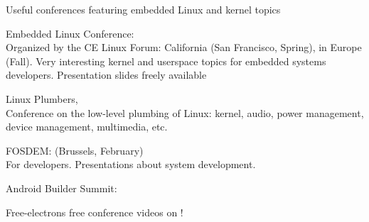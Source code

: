   Useful conferences featuring embedded Linux and kernel topics
  \startitemize
  \item Embedded Linux Conference: \\
    Organized by the CE Linux Forum: California (San Francisco,
    Spring), in Europe (Fall).  Very interesting kernel and userspace
    topics for embedded systems developers.  Presentation slides
    freely available
  \item Linux Plumbers, \\
    Conference on the low-level plumbing of Linux: kernel, audio,
    power management, device management, multimedia, etc.
  \item FOSDEM:  (Brussels, February)\\
    For developers. Presentations about system development.
  \item Android Builder Summit: 
  \item Free-electrons free conference videos on
    !
  \stopitemize
